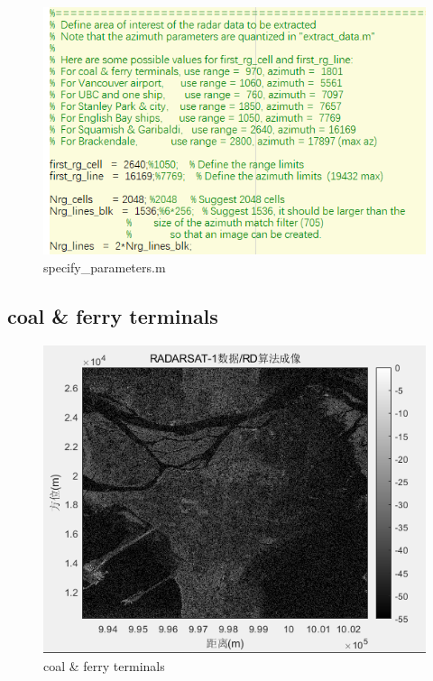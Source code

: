 \documentclass{article}
\begin{document}
\begin{figure}[H] %
	\centering
	\includegraphics[scale=0.6]{9.png}
	\caption{specify\_parameters.m}
	\label{9}
\end{figure}



\subsection{coal \& ferry terminals}
\begin{figure}[H] %
	\centering
	\includegraphics[scale=0.6]{10.png}
	\caption{coal \& ferry terminals}
	\label{10}
\end{figure}
\end{document}
